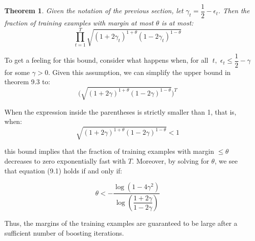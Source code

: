 \documentclass[twoside]{article}
\newcounter{lecnum}
\newtheorem{theorem}{Theorem}[lecnum]
\begin{document}
\begin{theorem}
Given the notation of the previous section, let $\gamma_{t} = \dfrac{1}{2} - \epsilon_{t}$. Then the fraction of training examples with margin at most $\theta$ is at most:
$$\prod_{t=1}^{T} \sqrt{(1+2 \gamma_{t} )^{1+\theta} (1-2 \gamma_{t})^{1-\theta}} $$
\end{theorem}

To get a feeling for this bound, consider what happens when, for all $ \;t,$  $ \epsilon_{t} \leq \dfrac{1}{2} - \gamma $   for
some $\gamma > 0$. Given this assumption, we can simplify the upper bound in theorem 9.3 to:
$$\Big(\sqrt{(1+2 \gamma )^{1+\theta} (1-2 \gamma)^{1-\theta}} \Big)^T$$

When the expression inside the parentheses is strictly smaller than 1, that is, when:
\begin{equation}
    \sqrt{(1+2 \gamma )^{1+\theta} (1-2 \gamma)^{1-\theta}} < 1
\end{equation}

this bound implies that the fraction of training examples with margin  $\leq \theta$ decreases to zero exponentially fast with $T$. Moreover, by solving for $\theta$, we see that equation (9.1)
holds if and only if:

$$\theta < - \dfrac{\log{(1-4 \gamma^2)}}{\log{(\dfrac{1+2 \gamma}{1- 2 \gamma})}}$$

Thus, the margins
of the training examples are guaranteed to be large after a sufficient number of boosting
iterations.
\end{document}
